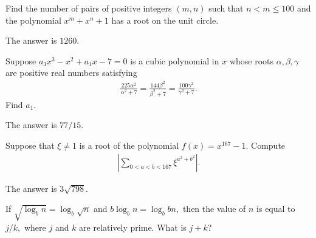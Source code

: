 \begin{question}[name={2022-23 CHMMC Winter, Individual Round, Problem 10}]
	Find the number of pairs of positive integers $(m,n)$ such that $n < m \leq 100$ and the polynomial $x^m+x^n+1$ has a root on the unit circle.
\end{question}


\begin{solution}%
	The answer is $\boxed{1260}$.
\end{solution}



\begin{question}[name={2022-23 CHMMC Winter, Team Round, Problem 8}]
	Suppose $a_3x^3-x^2+a_1x-7=0$ is a cubic polynomial in $x$ whose roots $\alpha,\beta,\gamma$ are positive real numbers satisfying
	\begin{align*}
		\frac{225\alpha^2}{\alpha^2+7}=\frac{144\beta^2}{\beta^2+7}=\frac{100\gamma^2}{\gamma^2+7}.
	\end{align*}
	Find $a_1$.
\end{question}


\begin{solution}%
	The answer is $\boxed{77/15}$.
\end{solution}


\begin{question}[name={2022-23 CHMMC Winter, Team Round, Problem 10}]
	Suppose that $\xi \neq 1$ is a root of the polynomial $f(x)=x^{167}-1$. Compute
	\begin{align*}
		\left| \sum_{0<a<b<167} \xi^{a^2+b^2}\right|.
	\end{align*}
\end{question}


\begin{solution}%
	The answer is $\boxed{3\sqrt{798}}$.
\end{solution}







\begin{question}[name={2023 AIME I, \href{https://artofproblemsolving.com/community/c4p27048897}{Problem 2}}]
	If $\sqrt{\log_bn}=\log_b\sqrt n$ and $b\log_bn=\log_bbn,$ then the value of $n$ is equal to $j/k,$ where $j$ and $k$ are relatively prime. What is $j+k$?
\end{question}


%	










